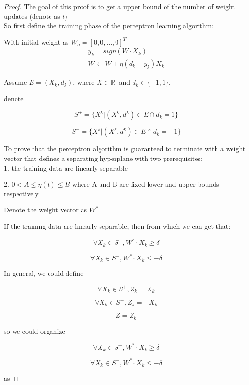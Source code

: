 \documentclass[11pt]{article}
\begin{document}
    \begin{proof}\mbox{}

	The goal of this proof is to get a upper bound of the number of weight updates (denote as \(t\))\\

So first define the training phase of the perceptron learning algorithm:

With initial weight as $W_o = [0, 0, ..., 0]^T$
\begin{equation}
\begin{aligned}
y_k = sign(W \cdot X_k) \\
W \leftarrow W+ \eta (d_k - y_k) X_k
\end{aligned}
\end{equation}

Assume $E = {(X_k, d_k)}$, where $X \in \mathbb{R}$, and $d_k \in \{-1, 1 \}$, 

denote 

$$S^+=\{ X^k | (X^k, d^k) \in E \cap d_k = 1 \}$$


$$S^- = \{ X^k | (X^k, d^k) \in E \cap d_k = -1 \}$$

To prove that the perceptron algorithm is guaranteed to terminate with a weight vector that defines a separating hyperplane with two prerequisites:\\

1. the training data are linearly separable

2. $0<A \le \eta(t) \le  B$ where A and B are fixed lower and upper bounds respectively\newline

Denote the weight vector as $W^*$

If the training data are linearly separable, then from which we can get that:

$$\forall X_k \in S^+, W^* \cdot X_k \ge \delta$$

$$\forall X_k \in S^-, W^* \cdot X_k \le -\delta$$


In general, we could define 


$$\forall X_k \in S^+, Z_k = X_k$$

$$\forall X_k \in S^-, Z_k = -X_k$$

$$Z = {Z_k}$$

so we could organize 

$$\forall X_k \in S^+, W^* \cdot X_k \ge \delta$$

$$\forall X_k \in S^-, W^* \cdot X_k \le -\delta$$


as


\end{proof}
\end{document}
